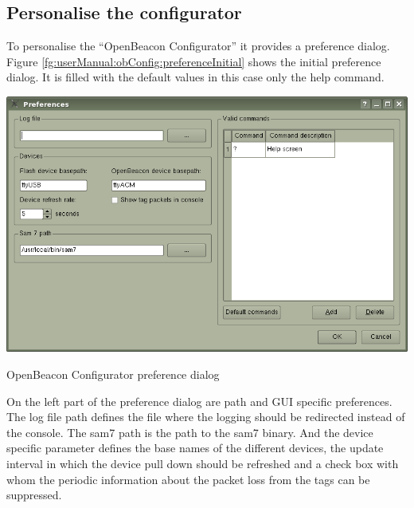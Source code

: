   \subsection{Personalise the configurator}
   To personalise the ``OpenBeacon Configurator'' it provides a preference dialog. Figure \ref{fg:userManual:obConfig:preferenceInitial} shows the initial preference dialog. It is filled with the default values in this case only the help command.
   \begin{staticFigure}
    \begin{center}
     \includegraphics[scale=0.7]{images/UserManual/obConfig/preferenceWindow-initial.png}
     \caption{OpenBeacon Configurator preference dialog}
     \label{fg:userManual:obConfig:preferenceInitial}
    \end{center}
   \end{staticFigure}
   On the left part of the preference dialog are path and GUI specific preferences. The log file path defines the file where the logging should be redirected instead of the console. The sam7 path is the path to the sam7 binary. And the device specific parameter defines the base names of the different devices, the update interval in which the device pull down should be refreshed and a check box with whom the periodic information about the packet loss from the tags can be suppressed.

